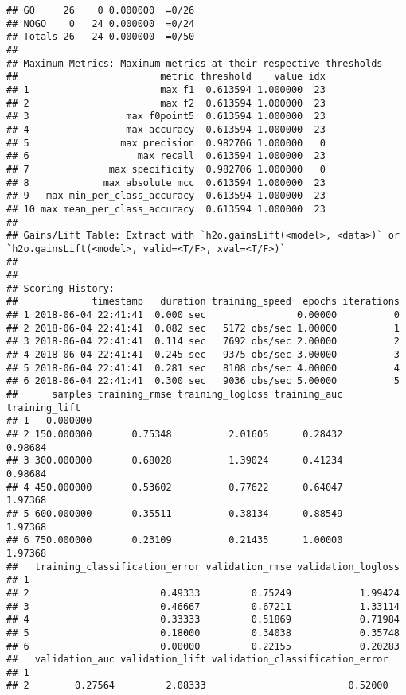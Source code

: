\documentclass[]{article}
\begin{document}
\begin{verbatim}
## GO     26    0 0.000000  =0/26
## NOGO    0   24 0.000000  =0/24
## Totals 26   24 0.000000  =0/50
## 
## Maximum Metrics: Maximum metrics at their respective thresholds
##                         metric threshold    value idx
## 1                       max f1  0.613594 1.000000  23
## 2                       max f2  0.613594 1.000000  23
## 3                 max f0point5  0.613594 1.000000  23
## 4                 max accuracy  0.613594 1.000000  23
## 5                max precision  0.982706 1.000000   0
## 6                   max recall  0.613594 1.000000  23
## 7              max specificity  0.982706 1.000000   0
## 8             max absolute_mcc  0.613594 1.000000  23
## 9   max min_per_class_accuracy  0.613594 1.000000  23
## 10 max mean_per_class_accuracy  0.613594 1.000000  23
## 
## Gains/Lift Table: Extract with `h2o.gainsLift(<model>, <data>)` or `h2o.gainsLift(<model>, valid=<T/F>, xval=<T/F>)`
## 
## 
## Scoring History: 
##             timestamp   duration training_speed  epochs iterations
## 1 2018-06-04 22:41:41  0.000 sec                0.00000          0
## 2 2018-06-04 22:41:41  0.082 sec   5172 obs/sec 1.00000          1
## 3 2018-06-04 22:41:41  0.114 sec   7692 obs/sec 2.00000          2
## 4 2018-06-04 22:41:41  0.245 sec   9375 obs/sec 3.00000          3
## 5 2018-06-04 22:41:41  0.281 sec   8108 obs/sec 4.00000          4
## 6 2018-06-04 22:41:41  0.300 sec   9036 obs/sec 5.00000          5
##      samples training_rmse training_logloss training_auc training_lift
## 1   0.000000                                                          
## 2 150.000000       0.75348          2.01605      0.28432       0.98684
## 3 300.000000       0.68028          1.39024      0.41234       0.98684
## 4 450.000000       0.53602          0.77622      0.64047       1.97368
## 5 600.000000       0.35511          0.38134      0.88549       1.97368
## 6 750.000000       0.23109          0.21435      1.00000       1.97368
##   training_classification_error validation_rmse validation_logloss
## 1                                                                 
## 2                       0.49333         0.75249            1.99424
## 3                       0.46667         0.67211            1.33114
## 4                       0.33333         0.51869            0.71984
## 5                       0.18000         0.34038            0.35748
## 6                       0.00000         0.22155            0.20283
##   validation_auc validation_lift validation_classification_error
## 1                                                               
## 2        0.27564         2.08333                         0.52000

\end{verbatim}
\end{document}
